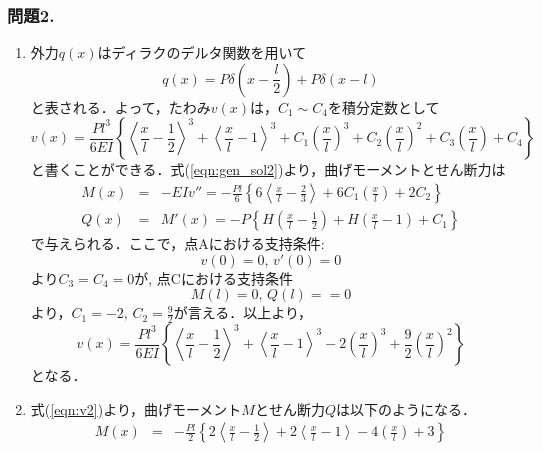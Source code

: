 \documentclass[10pt,a4j]{jarticle}
\begin{document}
\subsubsection*{問題2. }
\begin{enumerate}
\item
外力$q(x)$はディラクのデルタ関数を用いて
\begin{equation}
	q(x)=P\delta \left(x-\frac{l}{2} \right)
	+P\delta \left(x-l \right)
	\label{eqn:qx_dlt}
\end{equation}
と表される．よって，たわみ$v(x)$は，$C_1\sim C_4$を積分定数として
\begin{equation}
	v(x)=\frac{Pl^3}{6EI}\left\{
			\left< \frac{x}{l} -\frac{1}{2}\right>^3
			+
			\left< \frac{x}{l} -1\right>^3
			+
			C_1\left(\frac{x}{l}\right)^3
			+
			C_2\left(\frac{x}{l}\right)^2
			+
			C_3\left(\frac{x}{l}\right)
			+
			C_4
		\right\}
		\label{eqn:gen_sol2}
\end{equation}
	と書くことができる．式(\ref{eqn:gen_sol2})より，曲げモーメントとせん断力は
\begin{eqnarray}
	M(x) &=& -EIv''=-\frac{Pl}{6}\left\{
			6\left< \frac{x}{l} -\frac{2}{3}\right>
			+
			6C_1\left(\frac{x}{l}\right)
			+
			2C_2
		\right\} \\
	Q(x) &=& M'(x) =-P\left\{ 
		H\left( \frac{x}{l}-\frac{1}{2}\right)
		+
		H\left( \frac{x}{l}-1\right)
		+C_1
		\right\}
\end{eqnarray}
で与えられる．ここで，点Aにおける支持条件:
\begin{equation}
	v(0)=0,\, v'(0)=0
\end{equation}
より$C_3=C_4=0$が, 点Cにおける支持条件
\begin{equation}
	M(l)=0,\, Q(l)==0
\end{equation}
より，$C_1=-2, \, C_2=\frac{9}{2}$が言える．以上より，
\begin{equation}
	v(x)=\frac{Pl^3}{6EI}\left\{
			\left< \frac{x}{l} -\frac{1}{2}\right>^3
			+
			\left< \frac{x}{l} -1 \right>^3
			-
			2
			\left(\frac{x}{l}\right)^3
			+
			\frac{9}{2}\left( \frac{x}{l} \right)^2
			\right\}
	\label{eqn:v2}
\end{equation}
となる．
\item
式(\ref{eqn:v2})より，曲げモーメント$M$とせん断力$Q$は以下のようになる．
\begin{eqnarray}
	M(x) &=& 
		-\frac{Pl}{2}
			\left\{
				2\left< \frac{x}{l} - \frac{1}{2}\right> 
				+
				2\left< \frac{x}{l} - 1 \right> 
				-4\left(\frac{x}{l}\right)
				+3
			\right\}
	\label{eqn:M2}
	\\

\end{eqnarray}
\end{enumerate}
\end{document}

